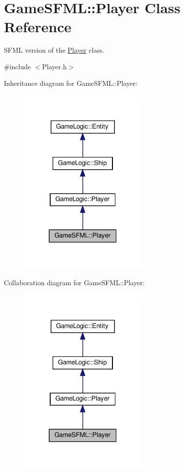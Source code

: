 \hypertarget{classGameSFML_1_1Player}{}\section{Game\+S\+F\+ML\+:\+:Player Class Reference}
\label{classGameSFML_1_1Player}


S\+F\+ML version of the \hyperlink{classGameSFML_1_1Player}{Player} class.  




{\ttfamily \#include $<$Player.\+h$>$}



Inheritance diagram for Game\+S\+F\+ML\+:\+:Player\+:\nopagebreak
\begin{figure}[H]
\begin{center}
\leavevmode
\includegraphics[width=183pt]{classGameSFML_1_1Player__inherit__graph}
\end{center}
\end{figure}


Collaboration diagram for Game\+S\+F\+ML\+:\+:Player\+:\nopagebreak
\begin{figure}[H]
\begin{center}
\leavevmode
\includegraphics[width=183pt]{classGameSFML_1_1Player__coll__graph}
\end{center}
\end{figure}
